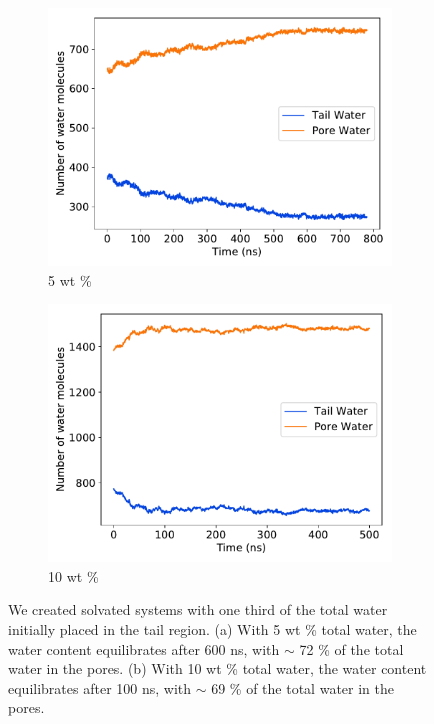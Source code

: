 \documentclass{article}
\begin{document}
\begin{enumerate}
    \begin{figure}[!htb]
    \centering
    \begin{subfigure}{0.45\textwidth}
    \includegraphics[width=\textwidth]{5wt_offset_equil.pdf}
    \caption{5 wt \%}\label{fig:5wt_offset_equil}
    \end{subfigure}
    \begin{subfigure}{0.45\textwidth}
    \includegraphics[width=\textwidth]{10wt_offset_equil.pdf}
    \caption{10 wt \%}\label{fig:10wt_offset_equil}
    \end{subfigure}
    \caption{We created solvated systems with one third of the total water
	  initially placed in the tail region. (a) With 5 wt \% total water, the water
	  content equilibrates after 600 ns, with $\sim$ 72 \% of the total water in the
	  pores. (b) With 10 wt \% total water, the water content equilibrates after 100
	  ns, with $\sim$ 69 \% of the total water in the
	  pores.}\label{fig:solvation_equilibration}
    \end{figure}
  

\end{enumerate}
\end{document}

